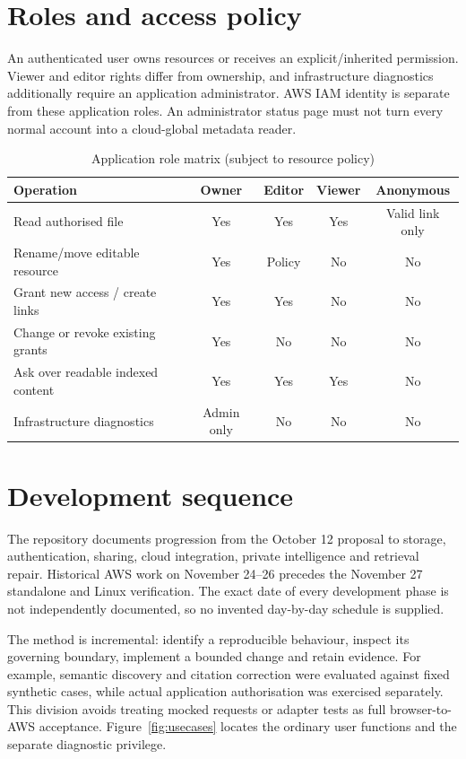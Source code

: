 \section{Roles and access policy}
An authenticated user owns resources or receives an explicit/inherited permission. Viewer and editor rights differ from ownership, and infrastructure diagnostics additionally require an application administrator. AWS IAM identity is separate from these application roles. An administrator status page must not turn every normal account into a cloud-global metadata reader.
\par\begin{table}[htbp]\caption{Application role matrix (subject to resource policy)}\small\begin{tabularx}{\linewidth}{Ycccc}\toprule Operation&Owner&Editor&Viewer&Anonymous\\\midrule
Read authorised file&Yes&Yes&Yes&Valid link only\\
Rename/move editable resource&Yes&Policy&No&No\\
Grant new access / create links&Yes&Yes&No&No\\
Change or revoke existing grants&Yes&No&No&No\\
Ask over readable indexed content&Yes&Yes&Yes&No\\
Infrastructure diagnostics&Admin only&No&No&No\\\bottomrule\end{tabularx}\end{table}\par
\section{Development sequence}
The repository documents progression from the October 12 proposal to storage, authentication, sharing, cloud integration, private intelligence and retrieval repair. Historical AWS work on November 24--26 precedes the November 27 standalone and Linux verification. The exact date of every development phase is not independently documented, so no invented day-by-day schedule is supplied.

The method is incremental: identify a reproducible behaviour, inspect its governing boundary, implement a bounded change and retain evidence. For example, semantic discovery and citation correction were evaluated against fixed synthetic cases, while actual application authorisation was exercised separately. This division avoids treating mocked requests or adapter tests as full browser-to-AWS acceptance.
Figure~\ref{fig:usecases} locates the ordinary user functions and the separate diagnostic privilege.
\FloatBarrier
